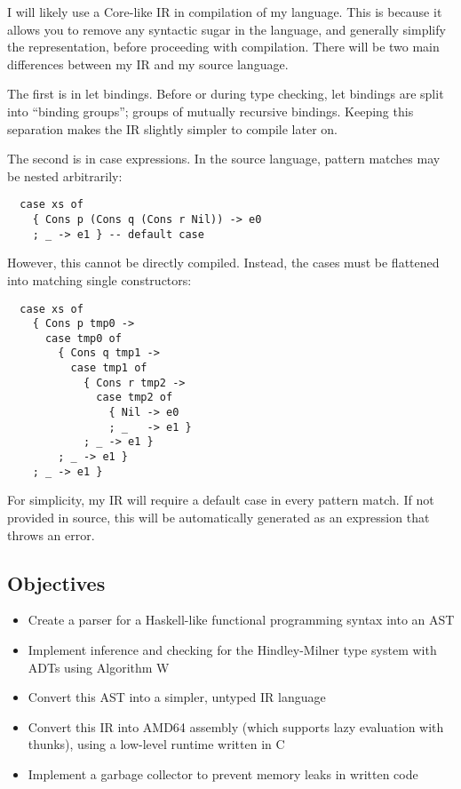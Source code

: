\documentclass[9pt]{extarticle}
\begin{document}
I will likely use a Core-like IR in compilation of my language. This is
because it allows you to remove any syntactic sugar in the language, and
generally simplify the representation, before proceeding with
compilation. There will be two main differences between my IR and my
source language.

The first is in let bindings. Before or during type checking, let
bindings are split into ``binding groups''; groups of mutually recursive
bindings. Keeping this separation makes the IR slightly simpler to
compile later on.

The second is in case expressions. In the source language, pattern
matches may be nested arbitrarily:

\begin{verbatim}
  case xs of
    { Cons p (Cons q (Cons r Nil)) -> e0
    ; _ -> e1 } -- default case
\end{verbatim}

However, this cannot be directly compiled. Instead, the cases must be
flattened into matching single constructors:

\begin{verbatim}
  case xs of
    { Cons p tmp0 ->
      case tmp0 of
        { Cons q tmp1 ->
          case tmp1 of
            { Cons r tmp2 ->
              case tmp2 of
                { Nil -> e0
                ; _   -> e1 }
            ; _ -> e1 }
        ; _ -> e1 }
    ; _ -> e1 }
\end{verbatim}

For simplicity, my IR will require a default case in every pattern
match. If not provided in source, this will be automatically generated
as an expression that throws an error.

\subsection{Objectives}

\begin{itemize}

  \item Create a parser for a Haskell-like functional programming syntax into an AST

  \item Implement inference and checking for the Hindley-Milner type system with ADTs
  using Algorithm W

  \item Convert this AST into a simpler, untyped IR language

  \item Convert this IR into AMD64 assembly (which supports lazy evaluation with
    thunks), using a low-level runtime written in C

  \item Implement a garbage collector to prevent memory leaks in written code

\end{itemize}
\end{document}
